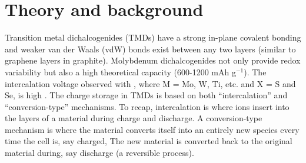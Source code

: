 \section{Theory and background}
Transition metal dichalcogenides (TMDs) have a strong in-plane covalent bonding and weaker van der Waals (vdW) bonds exist between any two layers (similar to graphene layers in graphite). Molybdenum dichalcogenides not only provide redox variability but also a high theoretical capacity (600-1200 mAh g$^{-1}$). The intercalation voltage observed with , where M = Mo, W, Ti, etc. and X = S and Se, is high \cite{cong_intrinsic_2015}. The charge storage in TMDs is based on both \enquote{intercalation} and \enquote{conversion-type} mechanisms. To recap, intercalation is where ions insert into the layers of a material during charge and discharge. A conversion-type mechanism is where the material converts itself into an entirely new species every time the cell is, say charged, The new material is converted back to the original material during, say discharge (a reversible process). 
